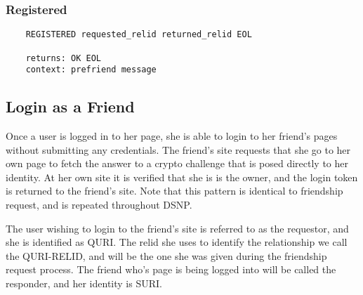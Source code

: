 \documentclass[letterpaper,11pt,oneside]{article}
\begin{document}
\subsubsection{Registered}

\vspace{10pt}
\begin{verbatim}
    REGISTERED requested_relid returned_relid EOL

    returns: OK EOL
    context: prefriend message
\end{verbatim}

\subsection{Login as a Friend}

Once a user is logged in to her page, she is able to login to her friend's
pages without submitting any credentials. The friend's site requests that she
go to her own page to fetch the answer to a crypto challenge that is posed
directly to her identity. At her own site it is verified that she is is the
owner, and the login token is returned to the friend's site. Note that this
pattern is identical to friendship request, and is repeated throughout DSNP.

The user wishing to login to the friend's site is referred to as the requestor,
and she is identified as QURI. The relid she uses to identify the relationship
we call the QURI-RELID, and will be the one she was given during the friendship
request process. The friend who's page is being logged into will be called the
responder, and her identity is SURI.
\end{document}
